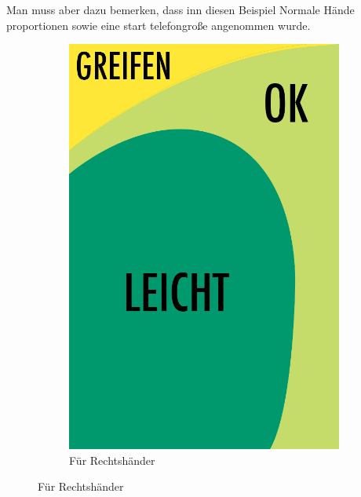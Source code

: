 Man muss aber dazu bemerken, dass inn diesen Beispiel Normale Hände proportionen sowie eine start telefongroße angenommen wurde.


\begin{figure}
	\centering
	\begin{subfigure}[b]{0.3\textwidth}
		\centering
			\includegraphics[width=1\textwidth]{img/anordungDerElementeSimple.png}
			\caption{Für Rechtshänder}\label{fig:rechtsPositioning}
			

\end{subfigure}
\end{figure}
